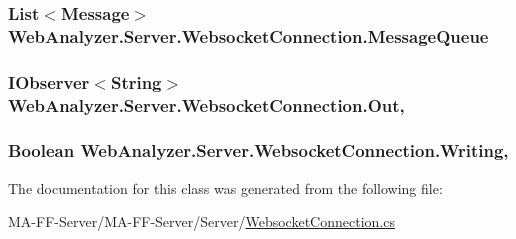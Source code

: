 \subsubsection[{Message\+Queue}]{\setlength{\rightskip}{0pt plus 5cm}List$<${\bf Message}$>$ Web\+Analyzer.\+Server.\+Websocket\+Connection.\+Message\+Queue\hspace{0.3cm}{\ttfamily [get]}}\label{class_web_analyzer_1_1_server_1_1_websocket_connection_a0351f67ba0d69e6d5701ef34395e0a59}
\hypertarget{class_web_analyzer_1_1_server_1_1_websocket_connection_a1f0be7b1ff80c5b742204d0883157578}{}
\subsubsection[{Out}]{\setlength{\rightskip}{0pt plus 5cm}I\+Observer$<$String$>$ Web\+Analyzer.\+Server.\+Websocket\+Connection.\+Out\hspace{0.3cm}{\ttfamily [get]}, {\ttfamily [set]}}\label{class_web_analyzer_1_1_server_1_1_websocket_connection_a1f0be7b1ff80c5b742204d0883157578}
\hypertarget{class_web_analyzer_1_1_server_1_1_websocket_connection_a973edb4f0e5e1644f551bf132ae77183}{}
\subsubsection[{Writing}]{\setlength{\rightskip}{0pt plus 5cm}Boolean Web\+Analyzer.\+Server.\+Websocket\+Connection.\+Writing\hspace{0.3cm}{\ttfamily [get]}, {\ttfamily [set]}}\label{class_web_analyzer_1_1_server_1_1_websocket_connection_a973edb4f0e5e1644f551bf132ae77183}


The documentation for this class was generated from the following file\+:\begin{DoxyCompactItemize}
\item 
M\+A-\/\+F\+F-\/\+Server/\+M\+A-\/\+F\+F-\/\+Server/\+Server/\hyperlink{_websocket_connection_8cs}{Websocket\+Connection.\+cs}\end{DoxyCompactItemize}
